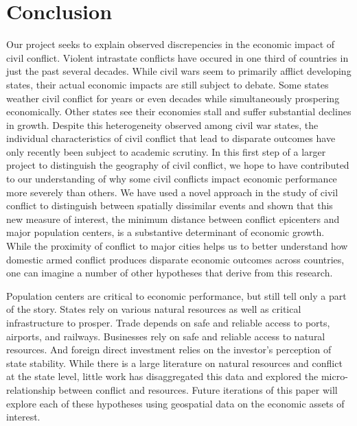 \section{Conclusion}
\label{conclusion}

Our project seeks to explain observed discrepencies in the economic impact of civil conflict.  Violent intrastate conflicts have occured in one third of countries in just the past several decades.  While civil wars seem to primarily afflict developing states, their actual economic impacts are still subject to debate.  Some states weather civil conflict for years or even decades while simultaneously prospering economically.  Other states see their economies stall and suffer substantial declines in growth.  Despite this heterogeneity observed among civil war states, the individual characteristics of civil conflict that lead to disparate outcomes have only recently been subject to academic scrutiny.  In this first step of a larger project to distinguish the geography of civil conflict, we hope to have contributed to our understanding of why some civil conflicts impact economic performance more severely than others.  We have used a novel approach in the study of civil conflict to distinguish between spatially dissimilar events and shown that this new measure of interest, the minimum distance between conflict epicenters and major population centers, is a substantive determinant of economic growth.  While the proximity of conflict to major cities helps us to better understand how domestic armed conflict produces disparate economic outcomes across countries, one can imagine a number of other hypotheses that derive from this research.

Population centers are critical to economic performance, but still tell only a part of the story.  States rely on various natural resources as well as critical infrastructure to prosper.  Trade depends on safe and reliable access to ports, airports, and railways.  Businesses rely on safe and reliable access to natural resources.  And foreign direct investment relies on the investor's perception of state stability.  While there is a large literature on natural resources and conflict at the state level, little work has disaggregated this data and explored the micro-relationship between conflict and resources.  Future iterations of this paper will explore each of these hypotheses using geospatial data on the economic assets of interest.


